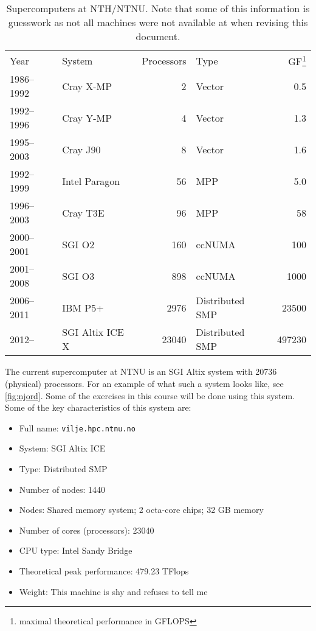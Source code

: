 \begin{table}
  \caption{
    Supercomputers at NTH/NTNU. Note that some of this information is guesswork
    as not all machines were not available at when revising this document.
  }
  \centering
  \bgroup{}
  \begin{tabular}{llrlr}
    \hline
    Year & System & Processors & Type & GF\footnote{maximal theoretical performance in GFLOPS} \\
    \hhline{=====}
    1986--1992 & Cray X-MP & 2 & Vector & 0.5 \\
    1992--1996 & Cray Y-MP & 4 & Vector & 1.3\\
    1995--2003 & Cray J90     & 8 & Vector & 1.6 \\
    1992--1999 & Intel Paragon & 56 & MPP & 5.0\\
    1996--2003 & Cray T3E & 96 & MPP & 58\\
    2000--2001 & SGI O2 & 160 & ccNUMA & 100\\
    2001--2008 & SGI O3 & 898 & ccNUMA & 1000\\
    2006--2011 & IBM P5+ & 2976 & Distributed SMP & 23500\\
    2012--     & SGI Altix ICE X & 23040 & Distributed SMP & 497230 \\
    \hline
  \end{tabular}
  \egroup
  \label{tab:history-ntnu}
\end{table}

The current supercomputer at NTNU is an SGI Altix system with 20736 (physical)
processors. For an example of what such a system looks like, see
\autoref{fig:njord}. Some of the exercises in this course will be done using
this system. Some of the key characteristics of this system are:
\begin{itemize}
\item Full name: \texttt{vilje.hpc.ntnu.no}
\item System: SGI Altix ICE
\item Type: Distributed SMP
\item Number of nodes: 1440
\item Nodes: Shared memory system; 2 octa-core chips; 32 GB memory
\item Number of cores (processors): 23040
\item CPU type: Intel Sandy Bridge
\item Theoretical peak performance: 479.23 TFlops
\item Weight: This machine is shy and refuses to tell me
\end{itemize}

